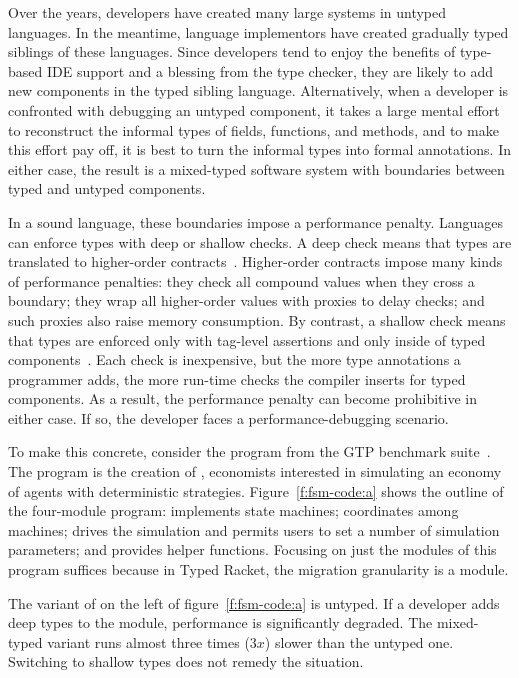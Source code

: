 
Over the years, developers have created many large systems in untyped languages.
In the meantime, language implementors have created gradually typed siblings of
these languages.  Since developers tend to enjoy the benefits of type-based IDE
support and a blessing from the type checker, they are likely to add new
components in the typed sibling language. Alternatively, when a developer is
confronted with debugging an untyped component, it takes a large mental effort
to reconstruct the informal types of fields, functions, and methods, and to make
this effort pay off, it is best to turn the informal types into formal
annotations. In either case, the result is a mixed-typed software system with
boundaries between typed and untyped components.

In a sound language, these boundaries impose a performance penalty.  Languages can
enforce types with deep or shallow checks. A deep check means that types are
translated to higher-order contracts~\cite{ff-icfp-2002,tf-dls-2006,st-sfp-2006}.
Higher-order contracts impose many kinds of performance penalties: they check all
compound values when they cross a boundary; they wrap all higher-order values with
proxies to delay checks; and such proxies also raise memory consumption. By
contrast, a shallow check means that types are enforced only with tag-level
assertions and only inside of typed components~\cite{vss-popl-2017,
vksb-dls-2014}. Each check is inexpensive, but the more type annotations a
programmer adds, the more run-time checks the compiler inserts for typed
components. As a result, the performance penalty can become prohibitive in
either case. If so, the developer faces a performance-debugging scenario.

To make this concrete, consider the  program from the GTP benchmark
suite~\cite{gtp-benchmarks}. The program is the creation of \citet{fsm},
economists interested in simulating an economy of agents with deterministic
strategies. Figure~\ref{f:fsm-code:a} shows the outline of the four-module
program:  implements state machines;  coordinates among
machines;  drives the simulation and permits users to set a number of
simulation parameters; and  provides helper functions.  Focusing on
just the modules of this program suffices because in Typed Racket, the migration
granularity is a module.

The variant of  on the left of figure~\ref{f:fsm-code:a} is untyped.
If a developer adds deep types to the  module, performance is
significantly degraded. The mixed-typed variant runs almost three times
($3x$) slower than the untyped one.  Switching to shallow types does not remedy
the situation. 

